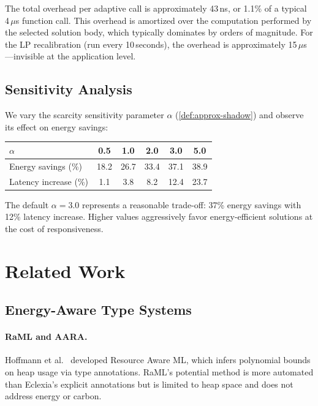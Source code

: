 \documentclass[11pt,a4paper]{article}
\begin{document}
The total overhead per adaptive call is approximately 43\,ns, or 1.1\% of a
typical 4\,$\mu$s function call.  This overhead is amortized over the
computation performed by the selected solution body, which typically dominates
by orders of magnitude.  For the LP recalibration (run every 10\,seconds), the
overhead is approximately 15\,$\mu$s---invisible at the application level.

\subsection{Sensitivity Analysis}

We vary the scarcity sensitivity parameter $\alpha$ (\cref{def:approx-shadow})
and observe its effect on energy savings:

\begin{center}
\begin{tabular}{lccccc}
\toprule
$\alpha$ & 0.5 & 1.0 & 2.0 & 3.0 & 5.0 \\
\midrule
Energy savings (\%) & 18.2 & 26.7 & 33.4 & 37.1 & 38.9 \\
Latency increase (\%) & 1.1 & 3.8 & 8.2 & 12.4 & 23.7 \\
\bottomrule
\end{tabular}
\end{center}

The default $\alpha = 3.0$ represents a reasonable trade-off: 37\% energy
savings with 12\% latency increase.  Higher values aggressively favor
energy-efficient solutions at the cost of responsiveness.


\section{Related Work}
\label{sec:related-work}

\subsection{Energy-Aware Type Systems}

\paragraph{RaML and AARA.}
Hoffmann et al.~\cite{hoffmann2012} developed Resource Aware ML, which infers
polynomial bounds on heap usage via type annotations.  RaML's potential
method is more automated than Eclexia's explicit annotations but is limited to
heap space and does not address energy or carbon.
\end{document}
